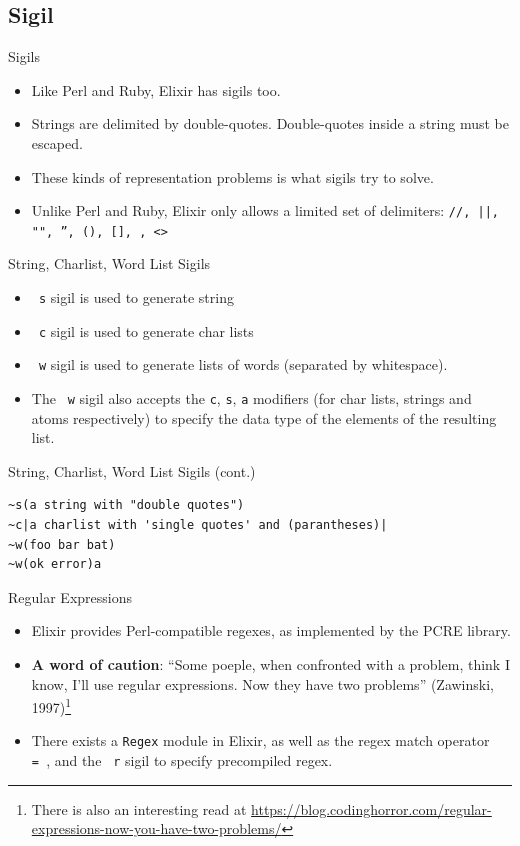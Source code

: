 \documentclass[12pt]{beamer}
\begin{document}
\subsection{Sigil}
\begin{frame}{Sigils}
  \begin{itemize}
    \item Like Perl and Ruby, Elixir has sigils too.
    \item Strings are delimited by double-quotes. Double-quotes inside a string must be escaped.
    \item These kinds of representation problems is what sigils try to solve.
    \item Unlike Perl and Ruby, Elixir only allows a limited set of delimiters: \texttt{//, ||, "", '', (), [], {}, <>}
  \end{itemize}
\end{frame}

\begin{frame}[fragile]{String, Charlist, Word List Sigils}
  \begin{itemize}
    \item \texttt{~s} sigil is used to generate string
    \item \texttt{~c} sigil is used to generate char lists
    \item \texttt{~w} sigil is used to generate lists of words (separated by whitespace).
    \item The \texttt{~w} sigil also accepts the \texttt{c}, \texttt{s}, \texttt{a} modifiers (for char lists, strings and atoms respectively) to specify the data type of the elements of the resulting list.
  \end{itemize}
\end{frame}

\begin{frame}[fragile]{String, Charlist, Word List Sigils (cont.)}
  \begin{verbatim}
~s(a string with "double quotes")
~c|a charlist with 'single quotes' and (parantheses)|
~w(foo bar bat)
~w(ok error)a
  \end{verbatim}
\end{frame}

\begin{frame}[fragile]{Regular Expressions}
  \begin{itemize}
    \item Elixir provides Perl-compatible regexes, as implemented by the PCRE library.
    \item \textbf{A word of caution}: ``Some poeple, when confronted with a problem, think I know, I'll use regular expressions. Now they have two problems'' (Zawinski, 1997)\footnote{There is also an interesting read at \url{https://blog.codinghorror.com/regular-expressions-now-you-have-two-problems/}}
    \item There exists a \texttt{Regex} module in Elixir, as well as the regex match operator \texttt{=~}, and the \texttt{~r} sigil to specify precompiled regex.
  \end{itemize}
\end{frame}
\end{document}
